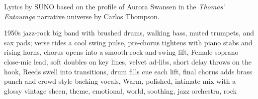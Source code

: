 
\begin{notes}
Lyrics by SUNO based on the profile of Aurora Swansen in the \emph{Thomas’ Entourage} narrative universe by Carlos Thompson.
\end{notes}
\begin{style}
1950s jazz-rock big band with brushed drums, walking bass, muted trumpets, and sax pads; verse rides a cool swing pulse, pre-chorus tightens with piano stabs and rising horns, chorus opens into a smooth rock-and-swing lift, Female soprano close-mic lead, soft doubles on key lines, velvet ad-libs, short delay throws on the hook, Reeds swell into transitions, drum fills cue each lift, final chorus adds brass punch and crowd-style backing vocals, Warm, polished, intimate mix with a glossy vintage sheen, theme, emotional, world, soothing, jazz orchestra, rock
\end{style}
